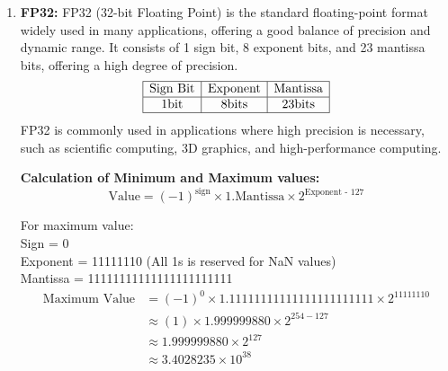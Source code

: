 \begin{enumerate}[label=\textbf{\roman*.}]
    \item \textbf{FP32:}
    FP32 (32-bit Floating Point) is the standard floating-point format widely used in many applications, offering a good balance of precision and dynamic range. It consists of 1 sign bit, 8 exponent bits, and 23 mantissa bits, offering a high degree of precision.
    \[
    \begin{array}{|c|c|c|}
        \hline
        \text{Sign Bit} & \text{Exponent} & \text{Mantissa} \\
        \hline
        1 \text{bit} & 8 \text{bits} & 23 \text{bits} \\
        \hline
    \end{array}
    \]
    FP32 is commonly used in applications where high precision is necessary, such as scientific computing, 3D graphics, and high-performance computing.

    \textbf{Calculation of Minimum and Maximum values:}
    \[
    \text{Value} = (-1)^{\text{sign}} \times 1.\text{Mantissa} \times 2^{\text{Exponent - 127}}
    \]

    For maximum value:\\
    Sign = 0 \\
    Exponent = 11111110 (All 1s is reserved for NaN values) \\
    Mantissa = 11111111111111111111111 
    \[
        \begin{aligned}
            \text{Maximum Value} &= (-1)^{0} \times 1.11111111111111111111111 \times 2^{11111110} \\
            & \approx (1) \times 1.999999880 \times 2^{254 - 127} \\
            & \approx 1.999999880 \times 2^{127} \\
            & \approx 3.4028235 \times 10^{38}
        \end{aligned}
    \]


\end{enumerate}
